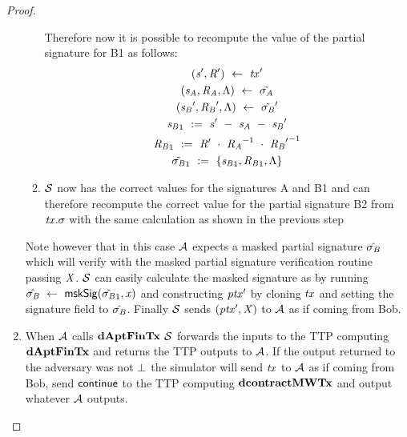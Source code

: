 \begin{proof}
\begin{enumerate}
\begin{enumerate}
            Therefore now it is possible to recompute the value of the partial signature for B1 as follows:
            \begin{gather*}
                ({\mathit{s}}', {\mathit{R}}') ~\leftarrow~ {\mathit{tx}}' \\
                (\mathit{s}_{\mathit{A}}, \mathit{R}_{\mathit{A}}, \Lambda) ~\leftarrow~ \tilde{\sigma_{\mathit{A}}} \\
                ({\mathit{s}_{\mathit{B}}}', {\mathit{R}_{\mathit{B}}}', \Lambda) ~\leftarrow~ {\tilde{\sigma_{\mathit{B}}}}' \\
                {\mathit{s}_{\mathit{B}}}_1 ~:=~ {\mathit{s}}' ~-~ \mathit{s}_{\mathit{A}} ~-~ {\mathit{s}_{\mathit{B}}}' \\
                {\mathit{R}_{\mathit{B}}}_1 ~:=~ {\mathit{R}}' ~\cdot~ {\mathit{R}_{\mathit{A}}}^{-1} ~\cdot~ {{\mathit{R}_{\mathit{B}}}'}^{-1} \\
                {\tilde{\sigma_{\mathit{B}}}}_1 ~:=~ \{ {\mathit{s}_{\mathit{B}}}_1, {\mathit{R}_{\mathit{B}}}_1, \Lambda \}
            \end{gather*}
            \item $\mathcal{S}$ now has the correct values for the signatures A and B1 and can therefore recompute the correct value for the partial signature B2 from $\mathit{tx}.\sigma$ with the same calculation as shown in the previous step
        \end{enumerate}
        Note however that in this case $\mathcal{A}$ expects a masked partial signature $\hat{\sigma_{\mathit{B}}}$ which will verify with the masked partial signature verification routine passing $\mathit{X}$.
        $\mathcal{S}$ can easily calculate the masked signature as by running $\hat{\sigma_{\mathit{B}}} ~\leftarrow~ \mathsf{mskSig}({\tilde{\sigma_{\mathit{B}}}_1}, \mathit{x})$ and constructing ${\mathit{ptx}}'$ by cloning $\mathit{tx}$ and setting the signature field to $\hat{\sigma_{\mathit{B}}}$.
        Finally $\mathcal{S}$ sends $({\mathit{ptx}}',\mathit{X})$ to $\mathcal{A}$ as if coming from Bob.
        \item When $\mathcal{A}$ calls $\mathbf{dAptFinTx}$ $\mathcal{S}$ forwards the inputs to the TTP computing $\mathbf{dAptFinTx}$ and returns the TTP outputs to $\mathcal{A}$.
        If the output returned to the adversary was not $\bot$ the simulator will send $\mathit{tx}$ to $\mathcal{A}$ as if coming from Bob, send $\mathsf{continue}$ to the TTP computing $\mathbf{dcontractMWTx}$ and output whatever $\mathcal{A}$ outputs.
    \end{enumerate}


\end{proof}
